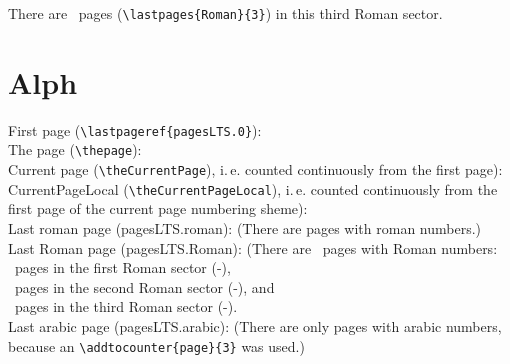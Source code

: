 \documentclass[british]{article}
\def\pagesLTSexampleArabic{3}
\begin{document}
\bigskip

There are ~pages
(\texttt{\textbackslash lastpages\{Roman\}\{3\}})
in this third Roman sector.\\

\newpage


\section{Alph}

\noindent First page (\texttt{\textbackslash lastpageref\{pagesLTS.0\}}):
 \\

\noindent The page (\texttt{\textbackslash thepage}): \thepage \\

\noindent Current page (\texttt{\textbackslash theCurrentPage}),
i.\,e. counted continuously from the first page): \theCurrentPage \\

\noindent CurrentPageLocal (\texttt{\textbackslash theCurrentPageLocal}),
i.\,e. counted continuously from the first page of the
current page numbering sheme): \theCurrentPageLocal \\

\noindent Last roman page (pagesLTS.roman): 
(There are  pages with roman numbers.)\\

\noindent Last Roman page (pagesLTS.Roman): 
(There are ~pages with Roman numbers:\\
~pages in the first Roman sector
(\pageref{Roman}{\hskip3em }-),\\
~pages in the second Roman sector
(\pageref{Roman2}{\hskip3em }-), and\\
~pages in the third Roman sector
(\pageref{Roman3}{\hskip3em }-).\\

\noindent Last arabic page (pagesLTS.arabic): 
(There are only  pages with arabic numbers,
because an \texttt{\textbackslash addtocounter\{page\}\{\pagesLTSexampleArabic\}} was used.)\\
\end{document}
